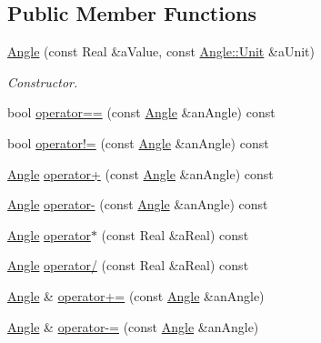 \subsection*{Public Member Functions}
\begin{DoxyCompactItemize}
\item 
\hyperlink{classostk_1_1math_1_1geom_1_1_angle_ae545d79270fdf143d008d7aa4af46a55}{Angle} (const Real \&a\+Value, const \hyperlink{classostk_1_1math_1_1geom_1_1_angle_abb73526d3f7f94a3b33e8358e1b18027}{Angle\+::\+Unit} \&a\+Unit)
\begin{DoxyCompactList}\small\item\em Constructor. \end{DoxyCompactList}\item 
bool \hyperlink{classostk_1_1math_1_1geom_1_1_angle_aca8e2c560e71b020464a0b118d185f36}{operator==} (const \hyperlink{classostk_1_1math_1_1geom_1_1_angle}{Angle} \&an\+Angle) const
\item 
bool \hyperlink{classostk_1_1math_1_1geom_1_1_angle_a041d4a5cacf76b591a2c1c0dc14fa77d}{operator!=} (const \hyperlink{classostk_1_1math_1_1geom_1_1_angle}{Angle} \&an\+Angle) const
\item 
\hyperlink{classostk_1_1math_1_1geom_1_1_angle}{Angle} \hyperlink{classostk_1_1math_1_1geom_1_1_angle_a8af6533c24da96b346917085632af922}{operator+} (const \hyperlink{classostk_1_1math_1_1geom_1_1_angle}{Angle} \&an\+Angle) const
\item 
\hyperlink{classostk_1_1math_1_1geom_1_1_angle}{Angle} \hyperlink{classostk_1_1math_1_1geom_1_1_angle_a08ceed11f370427916fa00dc2d5e5584}{operator-\/} (const \hyperlink{classostk_1_1math_1_1geom_1_1_angle}{Angle} \&an\+Angle) const
\item 
\hyperlink{classostk_1_1math_1_1geom_1_1_angle}{Angle} \hyperlink{classostk_1_1math_1_1geom_1_1_angle_a8b35f525ff9de7a3b59098c144f0b4b1}{operator$\ast$} (const Real \&a\+Real) const
\item 
\hyperlink{classostk_1_1math_1_1geom_1_1_angle}{Angle} \hyperlink{classostk_1_1math_1_1geom_1_1_angle_a8181201079ef62c428c4d4fe01bf33f0}{operator/} (const Real \&a\+Real) const
\item 
\hyperlink{classostk_1_1math_1_1geom_1_1_angle}{Angle} \& \hyperlink{classostk_1_1math_1_1geom_1_1_angle_a171c1f1f5dde76fb9b50e7f2b45cd477}{operator+=} (const \hyperlink{classostk_1_1math_1_1geom_1_1_angle}{Angle} \&an\+Angle)
\item 
\hyperlink{classostk_1_1math_1_1geom_1_1_angle}{Angle} \& \hyperlink{classostk_1_1math_1_1geom_1_1_angle_aff9a9b5df3b3d1f274230e2787a868bd}{operator-\/=} (const \hyperlink{classostk_1_1math_1_1geom_1_1_angle}{Angle} \&an\+Angle)

\end{DoxyCompactItemize}
